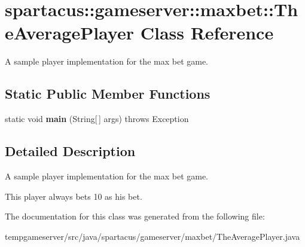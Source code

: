 \hypertarget{classspartacus_1_1gameserver_1_1maxbet_1_1TheAveragePlayer}{
\section{\-s\-p\-a\-r\-t\-a\-c\-u\-s\-:\-:\-g\-a\-m\-e\-s\-e\-r\-v\-e\-r\-:\-:\-m\-a\-x\-b\-e\-t\-:\-:\-T\-h\-e\-A\-v\-e\-r\-a\-g\-e\-P\-l\-a\-y\-e\-r \-C\-l\-a\-s\-s \-R\-e\-f\-e\-r\-e\-n\-c\-e}
\label{classspartacus_1_1gameserver_1_1maxbet_1_1TheAveragePlayer}
}


A sample player implementation for the max bet game.  


\subsection*{Static Public Member Functions}
\begin{DoxyCompactItemize}
\item 
\hypertarget{classspartacus_1_1gameserver_1_1maxbet_1_1TheAveragePlayer_adf1a1af6bfc7bfc8ca97ce5f10e2370f}{
\-s\-t\-a\-t\-i\-c \-v\-o\-i\-d {\bfseries \-m\-a\-i\-n} \-(\-S\-t\-r\-i\-n\-g\mbox{[}$\,$\mbox{]} \-a\-r\-g\-s\-)  \-t\-h\-r\-o\-ws \-E\-x\-c\-e\-p\-t\-i\-on }
\label{classspartacus_1_1gameserver_1_1maxbet_1_1TheAveragePlayer_adf1a1af6bfc7bfc8ca97ce5f10e2370f}

\end{DoxyCompactItemize}


\subsection{Detailed Description}
A sample player implementation for the max bet game. 

This player always bets 10 as his bet. 

The documentation for this class was generated from the following file:\begin{DoxyCompactItemize}
\item 
\-t\-e\-m\-p\-g\-a\-m\-e\-s\-e\-r\-v\-e\-r\-/\-s\-r\-c\-/\-j\-a\-v\-a\-/\-s\-p\-a\-r\-t\-a\-c\-u\-s\-/\-g\-a\-m\-e\-s\-e\-r\-v\-e\-r\-/\-m\-a\-x\-b\-e\-t\-/\-T\-h\-e\-A\-v\-e\-r\-a\-g\-e\-P\-l\-a\-y\-e\-r\-.\-j\-a\-v\-a\end{DoxyCompactItemize}
